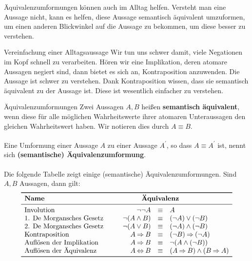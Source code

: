 \documentclass[../../main.tex]{subfiles}
\begin{document}
    Äquivalenzumformungen können auch im Alltag helfen. Versteht man eine Aussage nicht,
    kann es helfen, diese Aussage semantisch äquivalent umzuformen, um einen anderen
    Blickwinkel auf die Aussage zu bekommen, um diese besser zu verstehen.

    \begin{example}{Vereinfachung einer Alltagsaussage}
        Wir tun uns schwer damit, viele Negationen im Kopf schnell zu verarbeiten.
        Hören wir eine Implikation, deren atomare Aussagen negiert sind, dann bietet es sich
        an, Kontraposition anzuwenden. Die Aussage
        ist schwer zu verstehen. Dank Kontraposition wissen, dass sie
        semantisch äquivalent zu der Aussage
        ist. Diese ist wesentlich einfacher zu verstehen.
        
    \end{example}

    \begin{nutshell}{Äquivalenzumformungen}
        Zwei Aussagen $A,B$ heißen \textbf{semantisch äquivalent}, wenn diese für alle möglichen Wahrheitswerte ihrer
        atomaren Unteraussagen den gleichen Wahrheitswert haben. Wir notieren dies durch $A \equiv B$.
        \\ \\
        Eine Umformung einer Aussage $A$ zu einer Aussage $A^{\prime}$, so dass $A \equiv A^{\prime}$ ist, nennt sich \textbf{(semantische) Äquivalenzumformung}.
        \\ \\
        Die folgende Tabelle zeigt einige (semantische) Äquivalenzumformungen. Sind $A,B$ Aussagen, dann gilt:
        \[\begin{array}{l@{\hspace{1cm}}rcl}\toprule
        \textbf{Name} & & \makebox[0cm]{\textbf{Äquivalenz}}\\\midrule
        \text{Involution} & \lnot \lnot A &\equiv& A\\
        \text{1. De Morgansches Gesetz} & \lnot (A \land B) &\equiv& (\lnot A) \lor (\lnot B)\\
        \text{2. De Morgansches Gesetz} & \lnot (A \lor B) &\equiv& (\lnot A) \land (\lnot B) \\   
        \text{Kontraposition} & A \limplies B &\equiv& (\lnot B) \limplies (\lnot A) \\
        \text{Auflösen der Implikation} & A \limplies B & \equiv & \lnot (A \land (\lnot B))\\
        \text{Auflösen der Äquivalenz} & A \liff B & \equiv & (A \limplies B) \land (B \limplies A) \\
        \bottomrule
        \end{array}\]
    \end{nutshell}
\end{document}
